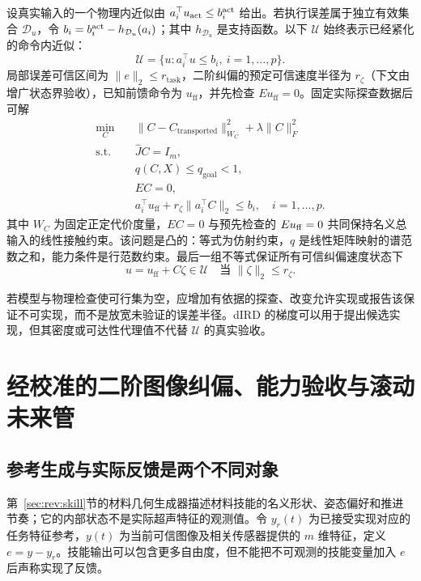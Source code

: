 \documentclass[11pt,a4paper]{article}
\numberwithin{equation}{section}
\theoremstyle{definition}
\begin{document}
设真实输入的一个物理内近似由 $a_i^\top u_{\rm act}\le b_i^{\rm act}$ 给出。若执行误差属于独立有效集合 $\mathcal D_u$，令 $b_i=b_i^{\rm act}-h_{\mathcal D_u}(a_i)$；其中 $h_{\mathcal D_u}$ 是支持函数。以下 $\mathcal U$ 始终表示已经紧化的命令内近似：
\begin{equation}
  \mathcal U=
  \{u:a_i^\top u\le b_i,\ i=1,\ldots,p\}.
\end{equation}
局部误差可信区间为 $\|e\|_2\le r_{\mathrm{task}}$，二阶纠偏的预定可信速度半径为 $r_\zeta$（下文由增广状态界验收），已知前馈命令为 $u_{\mathrm{ff}}$，并先检查 $Eu_{\mathrm{ff}}=0$。固定实际探查数据后可解
\begin{equation}
\begin{aligned}
  \min_C\quad&
  \|C-C_{\mathrm{transported}}\|_{W_C}^2+
  \lambda\|C\|_F^2\\
  \text{s.t.}\quad&
  \widehat JC=I_m,\\
  &q(C,X)\le q_{\mathrm{goal}}<1,\\
  &EC=0,\\
  &a_i^\top u_{\mathrm{ff}}
   +r_\zeta\|a_i^\top C\|_2
   \le b_i,\quad i=1,\ldots,p.
\end{aligned}
\label{eq:cal-convex-repair}
\end{equation}
其中 $W_C$ 为固定正定代价度量，$EC=0$ 与预先检查的 $Eu_{\rm ff}=0$ 共同保持名义总输入的线性接触约束。该问题是凸的：等式为仿射约束，$q$ 是线性矩阵映射的谱范数之和，能力条件是行范数约束。最后一组不等式保证所有可信纠偏速度状态下
\begin{equation}
  u=u_{\mathrm{ff}}+C\zeta\in\mathcal U\quad\text{当 }\|\zeta\|_2\le r_\zeta .
\end{equation}

若模型与物理检查使可行集为空，应增加有依据的探查、改变允许实现或报告该保证不可实现，而不是放宽未验证的误差半径。dIRD 的梯度可以用于提出候选实现，但其密度或可达性代理值不代替 $\mathcal U$ 的真实验收。



\section{经校准的二阶图像纠偏、能力验收与滚动未来管}
\label{sec:cal-recovery}

\subsection{参考生成与实际反馈是两个不同对象}

第~\ref{sec:rev:skill}节的材料几何生成器描述材料技能的名义形状、姿态偏好和推进节奏；它的内部状态不是实际超声特征的观测值。令 $y_r(t)$ 为已接受实现对应的任务特征参考，$y(t)$ 为当前可信图像及相关传感器提供的 $m$ 维特征，定义 $e=y-y_r$。技能输出可以包含更多自由度，但不能把不可观测的技能变量加入 $e$ 后声称实现了反馈。
\end{document}
